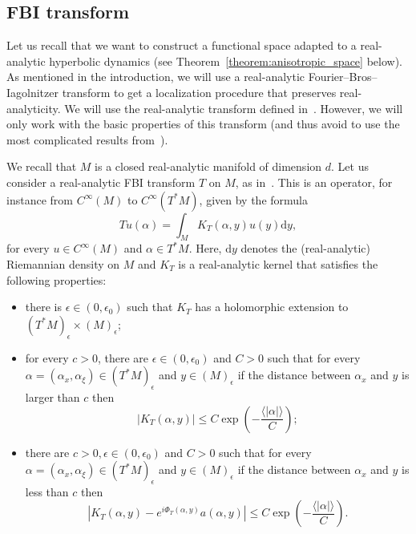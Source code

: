\documentclass[AHL,Unicode,longabstracts,published]{cedram}
\newcommand{\p}[1]{\left(#1\right)}
\newcommand{\va}[1]{\left|#1\right|}
\newcommand{\brac}[1]{\langle #1 \rangle}
\newcommand{\rmd}{\mathrm{d}}
\begin{document}
\subsection{FBI transform}\label{subsection:FBI}

Let us recall that we want to construct a functional space adapted to a real-analytic hyperbolic dynamics (see Theorem~\ref{theorem:anisotropic_space} below). As mentioned in the introduction, we will use a real-analytic Fourier--Bros--Iagolnitzer transform to get a localization procedure that preserves real-analyticity. We will use the real-analytic transform defined in~\cite{BJ20}. However, we will only work with the basic properties of this transform (and thus avoid to use the most complicated results from~\cite{BJ20}).

We recall that $M$ is a closed real-analytic manifold of dimension $d$. Let us consider a real-analytic FBI transform $T$ on $M$, as in~\cite[Definition~2.1]{BJ20}. This is an operator, for instance from $C^\infty(M)$ to $C^\infty(T^* M)$, given by the formula
\begin{equation}\label{eq:fbi_from_kernel}
T u (\alpha) = \int_M K_T(\alpha,y) u(y) \rmd y,
\end{equation}
for every $u \in C^\infty(M)$ and $\alpha \in T^* M$. Here, $\rmd y$ denotes the (real-analytic) Riemannian density on $M$ and $K_T$ is a real-analytic kernel that satisfies the following properties:
\begin{itemize}
\item there is $\epsilon \in (0,\epsilon_0)$ such that $K_T$ has a holomorphic extension to $(T^* M)_{\epsilon} \times (M)_\epsilon$;
\item for every $c > 0$, there are $\epsilon \in (0,\epsilon_0)$ and $C > 0$ such that for every $\alpha = (\alpha_x,\alpha_\xi) \in (T^* M)_\epsilon$ and $y \in (M)_\epsilon$ if the distance between $\alpha_x$ and $y$ is larger than $c$ then
\begin{equation}\label{eq:pseudo_local}
\va{K_T(\alpha,y)} \leq C \exp\p{- \frac{\brac{\va{\alpha}}}{C}};
\end{equation}
\item there are $c > 0, \epsilon \in (0,\epsilon_0)$ and $C > 0$ such that for every $\alpha = (\alpha_x,\alpha_\xi) \in (T^* M)_\epsilon$ and $y \in (M)_\epsilon$ if the distance between $\alpha_x$ and $y$ is less than $c$ then
\begin{equation}\label{eq:local_descrption}
\va{K_T(\alpha,y) - e^{i \Phi_T(\alpha,y)} a(\alpha,y)} \leq C \exp\p{- \frac{\brac{\va{\alpha}}}{C}}.
\end{equation}
\end{itemize}
\end{document}
